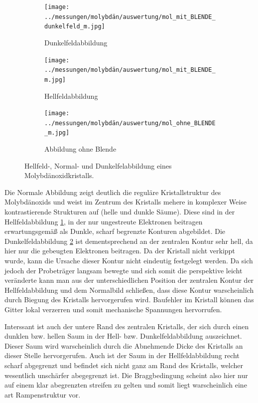 \documentclass[slug=TEM, room=IFW, supervisor=?, coursedate=23.\ 01.\ 2020]{../../Lab_Report_LaTeX/lab_report}
\begin{document}
\begin{figure}[htp]
  \centering
  \begin{subfigure}{.3\textwidth}
    \texttt{[image: ../messungen/molybdän/auswertung/mol\_mit\_BLENDE\_dunkelfeld\_m.jpg]}
    \caption{Dunkelfeldabbildung}%
    \label{fig:molpicts_df}
  \end{subfigure}
  \begin{subfigure}{.3\textwidth}
    \texttt{[image: ../messungen/molybdän/auswertung/mol\_mit\_BLENDE\_m.jpg]}
    \caption{Hellfeldabbildung}
    \label{fig:molpicts_hf}
  \end{subfigure}
  \begin{subfigure}{.3\textwidth}
    \texttt{[image: ../messungen/molybdän/auswertung/mol\_ohne\_BLENDE\_m.jpg]}
    \caption{Abbildung ohne Blende}
    \label{fig:molpicts_n}
  \end{subfigure}
  \caption{Hellfeld-, Normal- und Dunkelfelabbildung eines Molybd\"anoxidkristalls.}
  \label{fig:molpicts}
\end{figure}

Die Normale Abbildung zeigt deutlich die regul\"are Kristallstruktur
des Molybdänoxids und weist im Zentrum des Kristalls mehere in
komplexer Weise kontrastierende Strukturen auf (helle und dunkle
S\"aume). Diese sind in der Hellfeldabbildung \ref{fig:molpicts_df},
in der nur ungestreute Elektronen beitragen erwartungsgem\"a\ss{} als
Dunkle, scharf begrenzte Konturen abgebildet. Die Dunkelfeldabbildung
\ref{fig:molpicts_hf} ist dementsprechend an der zentralen Kontur sehr
hell, da hier nur die gebeugten Elektronen beitragen. Da der Kristall
nicht verkippt wurde, kann die Ursache dieser Kontur nicht eindeutig
festgelegt werden. Da sich jedoch der Probetr\"ager langsam bewegte
und sich somit die perspektive leicht ver\"anderte kann man aus der
unterschiedlichen Position der zentralen Kontur der Hellfeldabbildung
und dem Normalbild schließen, dass diese Kontur warscheinlich durch
Biegung des Kristalls hervorgerufen wird. Baufehler im Kristall
k\"onnen das Gitter lokal verzerren und somit mechanische Spannungen
hervorrufen.

Interssant ist auch der untere Rand des zentralen Kristalls, der sich
durch einen dunklen bzw. hellen Saum in der Hell-
bzw. Dunkelfeldabbildung auszeichnet. Dieser Saum wird warscheinlich
durch die Abnehmende Dicke des Kristalls an dieser Stelle
hervorgerufen. Auch ist der Saum in der Hellfeldabbildung recht scharf
abgegrenzt und befindet sich nicht ganz am Rand des Kristalls, welcher
wesentlich unsch\"arfer abegegrenzt ist. Die Braggbedingung scheint
also hier nur auf einem klar abegrenzten streifen zu gelten und somit
liegt warscheinlich eine art Rampenstruktur vor.
\end{document}
